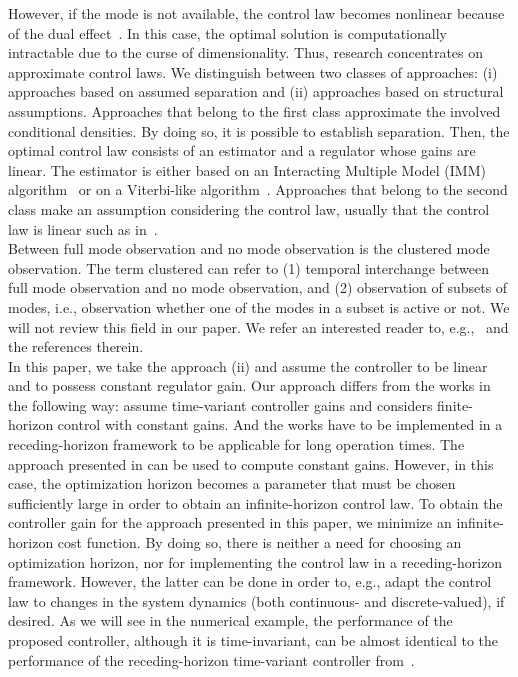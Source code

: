 \documentclass[preprint,1p,11pt]{IR-Template/ISAS_IR}
\begin{document}
However, if the mode is not available, the control law becomes nonlinear because of the dual effect~\cite{Griffiths_1985,Casiello_1989}. In this case, the optimal solution is computationally intractable due to the curse of dimensionality. Thus, research concentrates on approximate control laws. We distinguish between two classes of approaches: (i) approaches based on assumed separation and (ii) approaches based on structural assumptions. Approaches that belong to the first class approximate the involved conditional densities. By doing so, it is possible to establish separation. Then, the optimal control law consists of an estimator and a regulator whose gains are linear. The estimator is either based on an Interacting Multiple Model (IMM) algorithm~\cite{Campo_1992} or on a Viterbi-like algorithm~\cite{Gupta_2003}. Approaches that belong to the second class make an assumption considering the control law, usually that the control law is linear such as in~\cite{doVal_1999,Costa_2000,Vargas_2013,Vargas_2014}.\\

Between full mode observation and no mode observation is the clustered mode observation. The term clustered can refer to (1) temporal interchange between full mode observation and no mode observation, and (2) observation of subsets of modes, i.e., observation whether one of the modes in a subset is active or not. We will not review this field in our paper. We refer an interested reader to, e.g.,~\cite{doVal_1999,doVal_2002} and the references therein.\\

In this paper, we take the approach (ii) and assume the controller to be linear and to possess constant regulator gain. Our approach differs from the works \cite{doVal_1999,Costa_2000,Vargas_2013,Vargas_2014} in the following way: \cite{doVal_1999,Costa_2000,Vargas_2013} assume time-variant controller gains and \cite{Vargas_2014} considers finite-horizon control with constant gains. And the works \cite{doVal_1999,Costa_2000,Vargas_2013,Vargas_2014} have to be implemented in a receding-horizon framework to be applicable for long operation times. The approach presented in \cite{Vargas_2014} can be used to compute constant gains. However, in this case, the optimization horizon becomes a parameter that must be chosen sufficiently large in order to obtain an infinite-horizon control law. To obtain the controller gain for the approach presented in this paper, we minimize an infinite-horizon cost function. By doing so, there is neither a need for choosing an optimization horizon, nor for implementing the control law in a receding-horizon framework. However, the latter can be done in order to, e.g., adapt the control law to changes in the system dynamics (both continuous- and discrete-valued), if desired. As we will see in the numerical example, the performance of the proposed controller, although it is time-invariant, can be almost identical to the performance of the receding-horizon time-variant controller from~\cite{Vargas_2013}.\\
\end{document}
